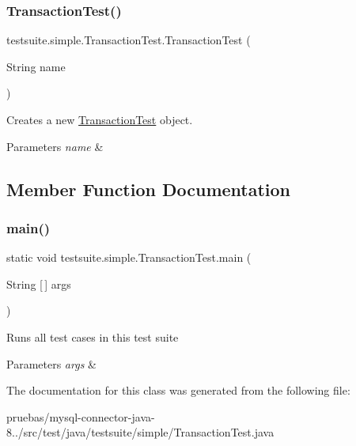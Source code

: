 \subsubsection{\texorpdfstring{Transaction\+Test()}{TransactionTest()}}
{\footnotesize\ttfamily testsuite.\+simple.\+Transaction\+Test.\+Transaction\+Test (\begin{DoxyParamCaption}\item[{String}]{name }\end{DoxyParamCaption})}

Creates a new \mbox{\hyperlink{classtestsuite_1_1simple_1_1_transaction_test}{Transaction\+Test}} object.


\begin{DoxyParams}{Parameters}
{\em name} & \\
\hline
\end{DoxyParams}


\subsection{Member Function Documentation}
\mbox{\label{classtestsuite_1_1simple_1_1_transaction_test_a64f59050254d996e0009d60f8cfed9ae}} 
\subsubsection{\texorpdfstring{main()}{main()}}
{\footnotesize\ttfamily static void testsuite.\+simple.\+Transaction\+Test.\+main (\begin{DoxyParamCaption}\item[{String \mbox{[}$\,$\mbox{]}}]{args }\end{DoxyParamCaption})\hspace{0.3cm}{\ttfamily [static]}}

Runs all test cases in this test suite


\begin{DoxyParams}{Parameters}
{\em args} & \\
\hline
\end{DoxyParams}


The documentation for this class was generated from the following file\+:\begin{DoxyCompactItemize}
\item 
pruebas/mysql-\/connector-\/java-\/8../src/test/java/testsuite/simple/Transaction\+Test.\+java\end{DoxyCompactItemize}

